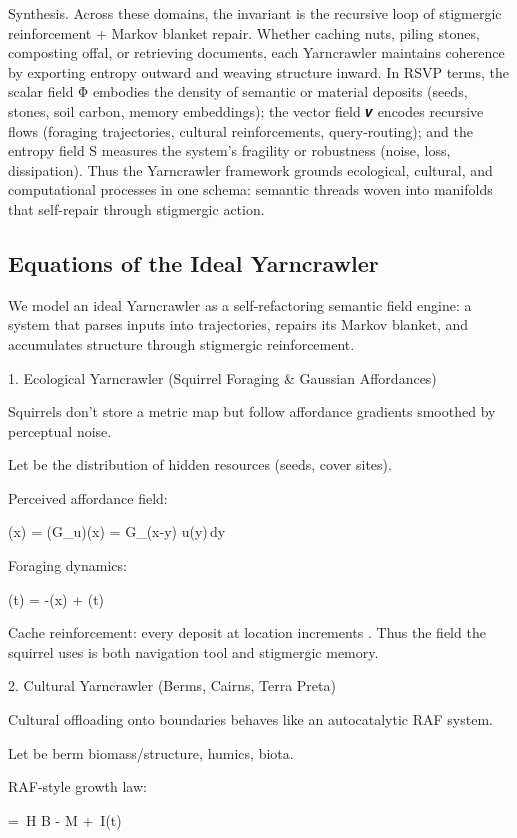 \documentclass{article}
\begin{document}
Synthesis.
Across these domains, the invariant is the recursive loop of stigmergic reinforcement + Markov blanket repair. Whether caching nuts, piling stones, composting offal, or retrieving documents, each Yarncrawler maintains coherence by exporting entropy outward and weaving structure inward. In RSVP terms, the scalar field Φ embodies the density of semantic or material deposits (seeds, stones, soil carbon, memory embeddings); the vector field 𝒗 encodes recursive flows (foraging trajectories, cultural reinforcements, query-routing); and the entropy field S measures the system’s fragility or robustness (noise, loss, dissipation). Thus the Yarncrawler framework grounds ecological, cultural, and computational processes in one schema: semantic threads woven into manifolds that self-repair through stigmergic action.

\subsection{Equations of the Ideal Yarncrawler}

We model an ideal Yarncrawler as a self-refactoring semantic field engine: a system that parses inputs into trajectories, repairs its Markov blanket, and accumulates structure through stigmergic reinforcement.

1. Ecological Yarncrawler (Squirrel Foraging \& Gaussian Affordances)

Squirrels don’t store a metric map but follow affordance gradients smoothed by perceptual noise.

Let  be the distribution of hidden resources (seeds, cover sites).

Perceived affordance field:


\psi(x) = (G_\sigma * u)(x) = \int G_\sigma(x-y) u(y)\,dy

Foraging dynamics:


(t) = -\nabla \psi(x) + \eta(t)

Cache reinforcement: every deposit at location  increments .
Thus the field the squirrel uses is both navigation tool and stigmergic memory.

2. Cultural Yarncrawler (Berms, Cairns, Terra Preta)

Cultural offloading onto boundaries behaves like an autocatalytic RAF system.

Let  be berm biomass/structure,  humics,  biota.

RAF-style growth law:


 = \alpha\,H B - \lambda M + \kappa\,I(t)
\end{document}

